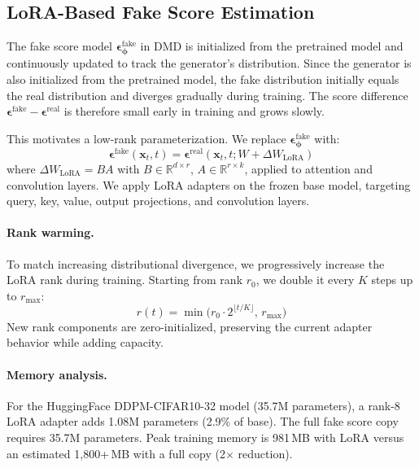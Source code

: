 \documentclass{article}
\theoremstyle{plain}
\theoremstyle{remark}
\newcommand{\R}{\mathbb{R}}
\newcommand{\bx}{\mathbf{x}}
\newcommand{\bepsilon}{\boldsymbol{\epsilon}}
\newcommand{\bphi}{\boldsymbol{\phi}}
\begin{document}
\subsection{LoRA-Based Fake Score Estimation}
\label{sec:lora_score}

The fake score model $\bepsilon^{\text{fake}}_{\bphi}$ in DMD is initialized from the pretrained model and continuously updated to track the generator's distribution. Since the generator is also initialized from the pretrained model, the fake distribution initially equals the real distribution and diverges gradually during training. The score difference $\bepsilon^{\text{fake}} - \bepsilon^{\text{real}}$ is therefore small early in training and grows slowly.

This motivates a low-rank parameterization. We replace $\bepsilon^{\text{fake}}_{\bphi}$ with:
\begin{equation}
\bepsilon^{\text{fake}}(\bx_t, t) = \bepsilon^{\text{real}}(\bx_t, t; W + \Delta W_{\text{LoRA}})
\label{eq:lora_score}
\end{equation}
where $\Delta W_{\text{LoRA}} = BA$ with $B \in \R^{d \times r}$, $A \in \R^{r \times k}$, applied to attention and convolution layers. We apply LoRA adapters on the frozen base model, targeting query, key, value, output projections, and convolution layers.

\paragraph{Rank warming.} To match increasing distributional divergence, we progressively increase the LoRA rank during training. Starting from rank $r_0$, we double it every $K$ steps up to $r_{\max}$:
\begin{equation}
r(t) = \min\bigl(r_0 \cdot 2^{\lfloor t / K \rfloor},\, r_{\max}\bigr)
\end{equation}
New rank components are zero-initialized, preserving the current adapter behavior while adding capacity.

\paragraph{Memory analysis.} For the HuggingFace DDPM-CIFAR10-32 model (35.7M parameters), a rank-8 LoRA adapter adds 1.08M parameters (2.9\% of base). The full fake score copy requires 35.7M parameters. Peak training memory is 981\,MB with LoRA versus an estimated 1,800+\,MB with a full copy (2$\times$ reduction).
\end{document}
